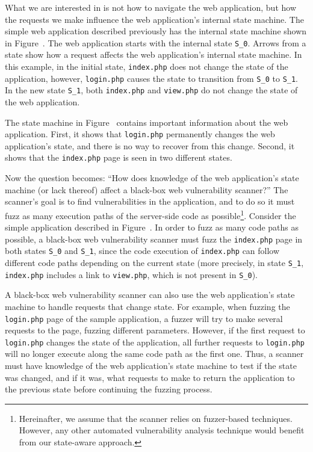 What we are interested in is not how to navigate the web application, but how
the requests we make influence the web application's internal state machine.
The simple web application described previously has the internal state machine shown
in Figure~. The web application starts with the internal
state \texttt{S\_0}. Arrows from a state show how a request affects the web
application's internal state machine. In this example, in the initial state,
\texttt{index.php} does not change the state of the application, however,
\texttt{login.php} causes the state to transition from \texttt{S\_0} to
\texttt{S\_1}. In the new state \texttt{S\_1}, both \texttt{index.php} and
\texttt{view.php} do not change the state of the web application.

The state machine in Figure~ contains important
information about the web application. First, it shows that \texttt{login.php}
permanently changes the web application's state, and there is no way to recover
from this change. Second, it shows that the \texttt{index.php} page is seen in
two different states.

Now the question becomes: ``How does knowledge of the web application's state
machine (or lack thereof) affect a black-box web vulnerability scanner?'' The
scanner's goal is to find vulnerabilities in the application, and to do so it
must fuzz as many execution paths of the server-side code as
possible\footnote{Hereinafter, we assume that the scanner relies on
  fuzzer-based techniques. However, any other automated vulnerability analysis
  technique would benefit from our state-aware approach.}. Consider the simple
application described in Figure~. In order to fuzz as
many code paths as possible, a black-box web vulnerability scanner must fuzz
the \texttt{index.php} page in both states \texttt{S\_0} and \texttt{S\_1},
since the code execution of \texttt{index.php} can follow different code paths
depending on the current state (more precisely, in state \texttt{S\_1},
\texttt{index.php} includes a link to \texttt{view.php}, which is not present
in \texttt{S\_0}).

A black-box web vulnerability scanner can also use the web application's state
machine to handle requests that change state. For example, when fuzzing the
\texttt{login.php} page of the sample application, a fuzzer will try to make
several requests to the page, fuzzing different parameters. However, if the
first request to \texttt{login.php} changes the state of the application, all
further requests to \texttt{login.php} will no longer execute along the same
code path as the first one. Thus, a scanner must have knowledge of the web
application's state machine to test if the state was changed, and if it was,
what requests to make to return the application to the previous state before
continuing the fuzzing process.

